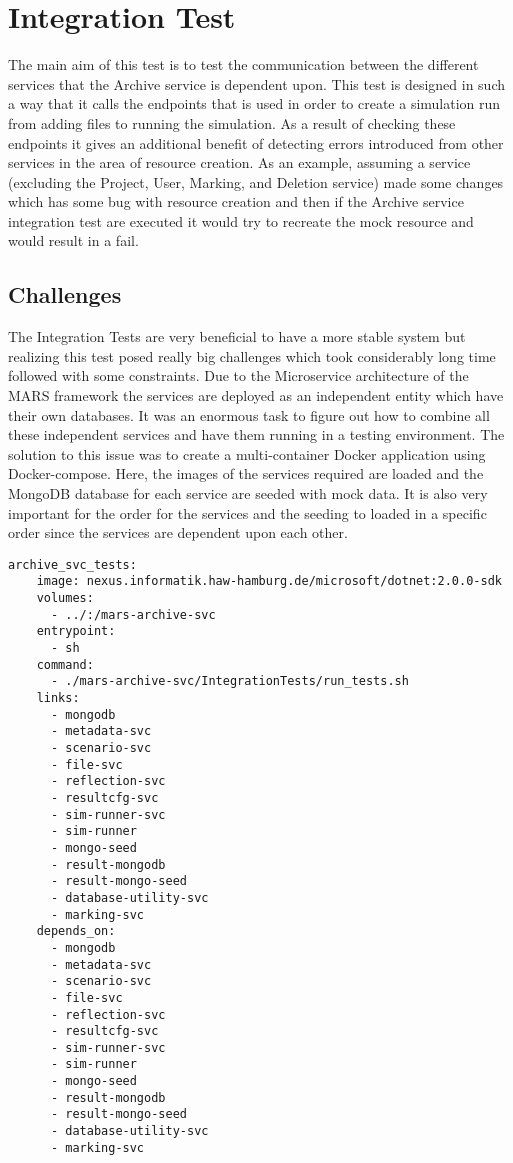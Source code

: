\section{Integration Test}
The main aim of this test is to test the communication between the different services that the Archive service is dependent upon. This test is designed in 
such a way that it calls the endpoints that is used in order to create a simulation run from adding files to running the simulation. As a result of checking
these endpoints it gives an additional benefit of detecting errors introduced from other services in the area of resource creation. As an example, assuming a service
(excluding the Project, User, Marking, and Deletion service)
made some changes which has some bug with resource creation and then if the Archive service integration test are executed it would try to recreate the mock resource
and would result in a fail.

\subsection{Challenges}
The Integration Tests are very beneficial to have a more stable system but realizing this test posed really big challenges which took considerably long time followed 
with some constraints. Due to the Microservice architecture of the MARS framework the services are deployed as an independent entity which have their own databases.
It was an enormous task to figure out how to combine all these independent services and have them running in a testing environment. The solution to this issue
was to create a multi-container Docker application using Docker-compose. Here, the images of the services required are loaded and the MongoDB database for each
service are seeded with mock data. It is also very important for the order for the services and the seeding to loaded in a specific order since the services are dependent upon
each other.  

\begin{lstlisting}[language=docker-compose,caption={Docker compose configuration snippet for Archive service Integration Test}, captionpos=b, breaklines=true,label={code:integCompose}]
archive_svc_tests:
    image: nexus.informatik.haw-hamburg.de/microsoft/dotnet:2.0.0-sdk
    volumes:
      - ../:/mars-archive-svc
    entrypoint:
      - sh
    command:
      - ./mars-archive-svc/IntegrationTests/run_tests.sh
    links:
      - mongodb
      - metadata-svc
      - scenario-svc
      - file-svc
      - reflection-svc
      - resultcfg-svc
      - sim-runner-svc
      - sim-runner
      - mongo-seed
      - result-mongodb
      - result-mongo-seed
      - database-utility-svc
      - marking-svc
    depends_on:
      - mongodb
      - metadata-svc
      - scenario-svc
      - file-svc
      - reflection-svc
      - resultcfg-svc
      - sim-runner-svc
      - sim-runner
      - mongo-seed
      - result-mongodb
      - result-mongo-seed
      - database-utility-svc
      - marking-svc
\end{lstlisting}      

